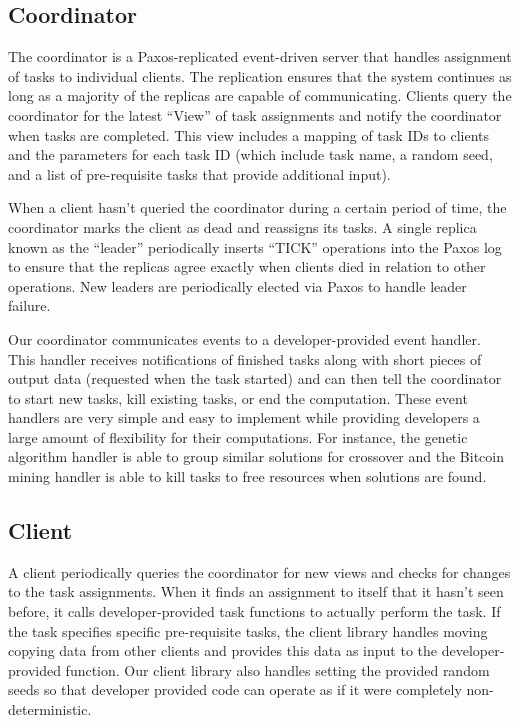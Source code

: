 \documentclass [11pt, twocolumn] {article}
\begin{document}
\subsection {Coordinator} 

The coordinator is a Paxos-replicated event-driven server that handles assignment of tasks to individual clients. The replication ensures that the system continues as long as a majority of the replicas are capable of communicating. Clients query the coordinator for the latest ``View'' of task assignments and notify the coordinator when tasks are completed. This view includes a mapping of task IDs to clients and the parameters for each task ID (which include task name, a random seed, and a list of pre-requisite tasks that provide additional input). 

When a client hasn't queried the coordinator during a certain period of time, the coordinator marks the client as dead and reassigns its tasks. A single replica known as the ``leader'' periodically inserts ``TICK'' operations into the Paxos log to ensure that the replicas agree exactly when clients died in relation to other operations. New leaders are periodically elected via Paxos to handle leader failure. 

Our coordinator communicates events to a developer-provided event handler. This handler receives notifications of finished tasks along with short pieces of output data (requested when the task started) and can then tell the coordinator to start new tasks, kill existing tasks, or end the computation. These event handlers are very simple and easy to implement while providing developers a large amount of flexibility for their computations. For instance, the genetic algorithm handler is able to group similar solutions for crossover and the Bitcoin mining handler is able to kill tasks to free resources when solutions are found. 

\subsection {Client} 

A client periodically queries the coordinator for new views and checks for changes to the task assignments. When it finds an assignment to itself that it hasn't seen before, it calls developer-provided task functions to actually perform the task. If the task specifies specific pre-requisite tasks, the client library handles moving copying data from other clients and provides this data as input to the developer-provided function. Our client library also handles setting the provided random seeds so that developer provided code can operate as if it were completely non-deterministic. 
\end{document}
